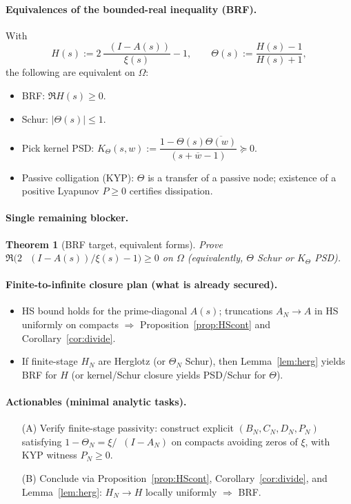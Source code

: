 \documentclass[11pt]{article}
\newtheorem{theorem}{Theorem}
\theoremstyle{remark}
\DeclareMathOperator{\dettwo}{det_2}
\begin{document}
\paragraph{Equivalences of the bounded-real inequality (BRF).} With
\[
H(s):=2\,\frac{\dettwo(I-A(s))}{\xi(s)}-1,\qquad \Theta(s):=\frac{H(s)-1}{H(s)+1},
\]
the following are equivalent on $\Omega$:
\begin{itemize}
\item BRF: $\Re H(s)\ge 0$.
\item Schur: $|\Theta(s)|\le 1$.
\item Pick kernel PSD: $K_\Theta(s,w):=\dfrac{1-\Theta(s)\overline{\Theta(w)}}{(s+\overline{w}-1)}\succeq 0$.
\item Passive colligation (KYP): $\Theta$ is a transfer of a passive node; existence of a positive Lyapunov $P\ge 0$ certifies dissipation.
\end{itemize}

\paragraph{Single remaining blocker.}
\begin{theorem}[BRF target, equivalent forms]\label{thm:BRF}
Prove $\Re\big(2\,\dettwo(I-A(s))/\xi(s)-1\big)\ge 0$ on $\Omega$ (equivalently, $\Theta$ Schur or $K_\Theta$ PSD).
\end{theorem}

\paragraph{Finite-to-infinite closure plan (what is already secured).}
\begin{itemize}
\item HS bound holds for the prime-diagonal $A(s)$; truncations $A_N\to A$ in HS uniformly on compacts $\Rightarrow$ Proposition~\ref{prop:HScont} and Corollary~\ref{cor:divide}.
\item If finite-stage $H_N$ are Herglotz (or $\Theta_N$ Schur), then Lemma~\ref{lem:herg} yields BRF for $H$ (or kernel/Schur closure yields PSD/Schur for $\Theta$).
\end{itemize}

\paragraph{Actionables (minimal analytic tasks).}
\begin{itemize}
\item[(A)] Verify finite-stage passivity: construct explicit $(B_N,C_N,D_N,P_N)$ satisfying $1-\Theta_N=\xi/\dettwo(I-A_N)$ on compacts avoiding zeros of $\xi$, with KYP witness $P_N\ge 0$.
\item[(B)] Conclude via Proposition~\ref{prop:HScont}, Corollary~\ref{cor:divide}, and Lemma~\ref{lem:herg}: $H_N\to H$ locally uniformly $\Rightarrow$ BRF.
\end{itemize}
\end{document}

